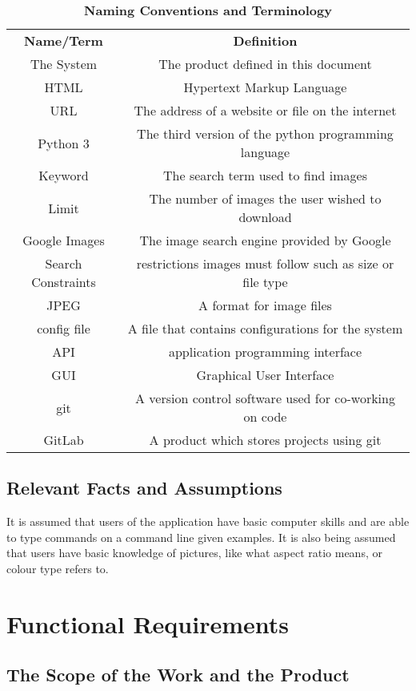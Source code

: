 \documentclass[12pt, titlepage]{article}
\begin{document}
\begin{table}[ht]
\caption{\bf Naming Conventions and Terminology}
\begin{tabular}{ |c|c| } 
 \hline
 \textbf{Name/Term} & \textbf{Definition}\\ 
 The System & The product defined in this document\\
 HTML & Hypertext Markup Language \\ 
 URL & The address of a website or file on the internet \\ 
 Python 3 & The third version of the python programming language \\
 Keyword & The search term used to find images\\
 Limit & The number of images the user wished to download\\
 Google Images & The image search engine provided by Google\\
 Search Constraints & restrictions images must follow such as size or file type\\
 JPEG & A format for image files\\ 
 config file & A file that contains configurations for the system\\
 API & application programming interface\\
 GUI & Graphical User Interface\\
 git & A version control software used for co-working on code\\
 GitLab & A product which stores projects using git\\
 \hline
\end{tabular}
\end{table}

\subsection{Relevant Facts and Assumptions}

It is assumed that users of the application have basic computer skills and are able to type commands on a command line given examples. It is also being assumed that users have basic knowledge of pictures, like what aspect ratio means, or colour type refers to.

\section{Functional Requirements}

\subsection{The Scope of the Work and the Product}
\end{document}
